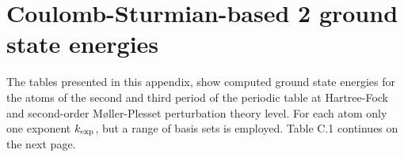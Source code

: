 \chapter{Coulomb-Sturmian-based {\MP}2 ground state energies}
\label{apx:CSCorrelationConvergence}


%	

The tables presented in this appendix,
show computed ground state energies for the atoms of the second
and third period of the periodic table
at Hartree-Fock and second-order Møller-Plesset perturbation theory level.
For each atom only one \CS exponent $k_\text{exp}$,
but a range of \CS basis sets is employed.
Table C.1 continues on the next page.

\hfill




